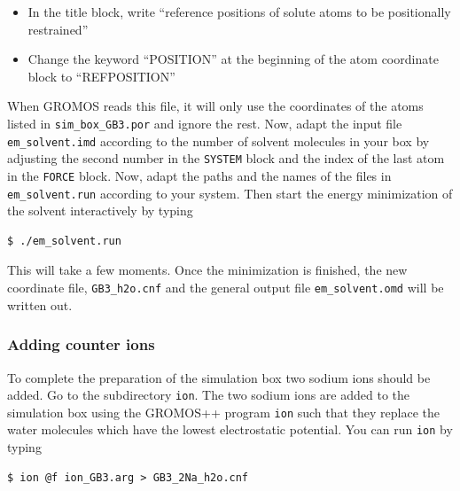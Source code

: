 \begin{itemize} 
\item	In the title block, write “reference positions of solute atoms to be positionally restrained”
\item	Change the keyword “POSITION” at the beginning of the atom coordinate block to “REFPOSITION”
\end{itemize}
When GROMOS reads this file, it will only use the coordinates of the atoms listed in \texttt{sim\_box\_GB3.por} and ignore the rest. 
Now, adapt the input file \texttt{em\_solvent.imd} according to the number of solvent molecules in your box by adjusting the second number in the \texttt{SYSTEM} block and the index of the last atom in the \texttt{FORCE} block.
Now, adapt the paths and the names of the files in \texttt{em\_solvent.run} according to your system. 
Then start the energy minimization of the solvent interactively by typing 
\begin{lstlisting}
$ ./em_solvent.run
\end{lstlisting}
This will take a few moments. Once the minimization is finished, the new coordinate file, \texttt{GB3\_h2o.cnf} and the general output file \texttt{em\_solvent.omd} will be written out. 

\subsubsection{Adding counter ions}

To complete the preparation of the simulation box two sodium ions should be added. Go to the subdirectory \texttt{ion}. The two sodium ions are added to the simulation box using the GROMOS++ program \texttt{ion} such that they replace the water molecules which have the lowest electrostatic potential. You can run \texttt{ion} by typing
\begin{lstlisting}
$ ion @f ion_GB3.arg > GB3_2Na_h2o.cnf
\end{lstlisting}

